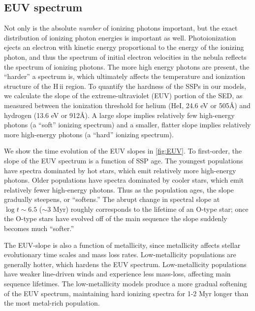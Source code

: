 \documentclass[twocolumn, tighten]{aastex61}
\newcommand{\Fig}[1]{\autoref{fig:#1}}
\newcommand{\hii}{H\,{\sc ii}\xspace}
\newcommand{\ang}{\ensuremath{\mbox{\AA}}}
\begin{document}
\subsection{EUV spectrum}\label{sec:spectra:EUV}

Not only is the absolute \emph{number} of ionizing photons important, but the exact distribution of ionizing photon energies is important as well. Photoionization ejects an electron with kinetic energy proportional to the energy of the ionizing photon, and thus the spectrum of initial electron velocities in the nebula reflects the spectrum of ionizing photons. The more high energy photons are present, the ``harder'' a spectrum is, which ultimately affects the temperature and ionization structure of the \hii region. To quantify the hardness of the SSPs in our models, we calculate the slope of the extreme-ultraviolet (EUV) portion of the SED, as measured between the ionization threshold for helium (HeI, 24.6 eV or 505\ang{}) and hydrogen (13.6 eV or 912\ang{}). A large slope implies relatively few high-energy photons (a ``soft'' ionizing spectrum) and a smaller, flatter slope implies relatively more high-energy photons (a ``hard'' ionizing spectrum). 

We show the time evolution of the EUV slopes in \Fig{EUV}. To first-order, the slope of the EUV spectrum is a function of SSP age. The youngest populations have spectra dominated by hot stars, which emit relatively more high-energy photons. Older populations have spectra dominated by cooler stars, which emit relatively fewer high-energy photons. Thus as the population ages, the slope gradually steepens, or ``softens.'' The abrupt change in spectral slope at $\log t \sim 6.5$ ($\sim 3$ Myr) roughly corresponds to the lifetime of an O-type star; once the O-type stars have evolved off of the main sequence the slope suddenly becomes much ``softer.''

The EUV-slope is also a function of metallicity, since metallicity affects stellar evolutionary time scales and mass loss rates. Low-metallicity populations are generally hotter, which hardens the EUV spectrum. Low-metallicity populations have weaker line-driven winds and experience less mass-loss, affecting main sequence lifetimes. The low-metallicity models produce a more gradual softening of the EUV spectrum, maintaining hard ionizing spectra for 1-2 Myr longer than the most metal-rich population. 
\end{document}
